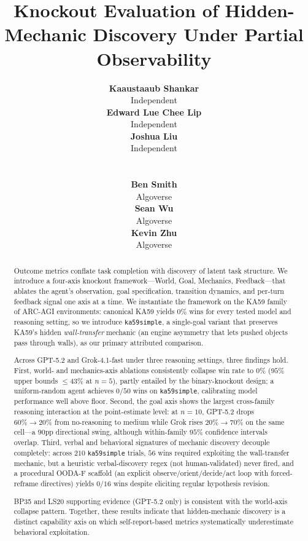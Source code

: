\documentclass{article}
\title{Knockout Evaluation of Hidden-Mechanic Discovery Under Partial Observability}
\author{%
  \begin{minipage}[t]{0.32\linewidth}\centering
    \textbf{Kaaustaaub Shankar} \\
    Independent
  \end{minipage}%
  \begin{minipage}[t]{0.32\linewidth}\centering
    \textbf{Edward Lue Chee Lip} \\
    Independent
  \end{minipage}%
  \begin{minipage}[t]{0.32\linewidth}\centering
    \textbf{Joshua Liu} \\
    Independent
  \end{minipage} \\[1.4em]
  \begin{minipage}[t]{0.32\linewidth}\centering
    \textbf{Ben Smith} \\
    Algoverse
  \end{minipage}%
  \begin{minipage}[t]{0.32\linewidth}\centering
    \textbf{Sean Wu} \\
    Algoverse
  \end{minipage}%
  \begin{minipage}[t]{0.32\linewidth}\centering
    \textbf{Kevin Zhu} \\
    Algoverse
  \end{minipage}
}
\begin{document}
\maketitle

\begin{abstract}
Outcome metrics conflate task completion with discovery of latent task structure. We introduce a four-axis knockout framework---World, Goal, Mechanics, Feedback---that ablates the agent's observation, goal specification, transition dynamics, and per-turn feedback signal one axis at a time. We instantiate the framework on the KA59 family of ARC-AGI environments: canonical KA59 yields $0\%$ wins for every tested model and reasoning setting, so we introduce \texttt{ka59simple}, a single-goal variant that preserves KA59's hidden \emph{wall-transfer} mechanic (an engine asymmetry that lets pushed objects pass through walls), as our primary attributed comparison.

Across GPT-5.2 and Grok-4.1-fast under three reasoning settings, three findings hold. First, world- and mechanics-axis ablations consistently collapse win rate to $0\%$ ($95\%$ upper bounds $\le 43\%$ at $n=5$), partly entailed by the binary-knockout design; a uniform-random agent achieves $0/50$ wins on \texttt{ka59simple}, calibrating model performance well above floor. Second, the goal axis shows the largest cross-family reasoning interaction at the point-estimate level: at $n=10$, GPT-5.2 drops $60\% \to 20\%$ from no-reasoning to medium while Grok rises $20\% \to 70\%$ on the same cell---a $90$pp directional swing, although within-family $95\%$ confidence intervals overlap. Third, verbal and behavioral signatures of mechanic discovery decouple completely: across $210$ \texttt{ka59simple} trials, $56$ wins required exploiting the wall-transfer mechanic, but a heuristic verbal-discovery regex (not human-validated) never fired, and a procedural OODA-F scaffold (an explicit observe/orient/decide/act loop with forced-reframe directives) yields $0/16$ wins despite eliciting regular hypothesis revision.

BP35 and LS20 supporting evidence (GPT-5.2 only) is consistent with the world-axis collapse pattern. Together, these results indicate that hidden-mechanic discovery is a distinct capability axis on which self-report-based metrics systematically underestimate behavioral exploitation.
\end{abstract}
\end{document}
